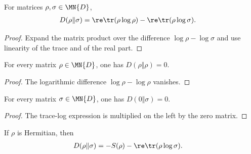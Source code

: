 \begin{lemma}
    \label{lem:quantum_relative_entropy_trace_split}
    \leanok
    For matrices $\rho,\sigma\in\MN{D}$,
    \begin{align}
        D(\rho\Vert\sigma)
         & =\re\tr(\rho\log\rho)-\re\tr(\rho\log\sigma).
        \label{eq:entropy_relative_split}
    \end{align}
\end{lemma}

\begin{proof}\leanok
    Expand the matrix product over the difference $\log\rho-\log\sigma$ and use
    linearity of the trace and of the real part.
\end{proof}

\begin{lemma}
    \label{lem:quantum_relative_entropy_self}
    \leanok
    For every matrix $\rho\in\MN{D}$, one has $D(\rho\Vert\rho)=0$.
\end{lemma}

\begin{proof}\leanok
    The logarithmic difference $\log\rho-\log\rho$ vanishes.
\end{proof}

\begin{lemma}
    \label{lem:quantum_relative_entropy_zero_left}
    \leanok
    For every matrix $\sigma\in\MN{D}$, one has $D(0\Vert\sigma)=0$.
\end{lemma}

\begin{proof}\leanok
    The trace-log expression is multiplied on the left by the zero matrix.
\end{proof}

\begin{theorem}
    \label{thm:quantum_relative_entropy_entropy_form}
    \leanok
    If $\rho$ is Hermitian, then
    \begin{align}
        D(\rho\Vert\sigma)
         & =-S(\rho)-\re\tr(\rho\log\sigma).
        \label{eq:entropy_relative_entropy_form}
    \end{align}
\end{theorem}

